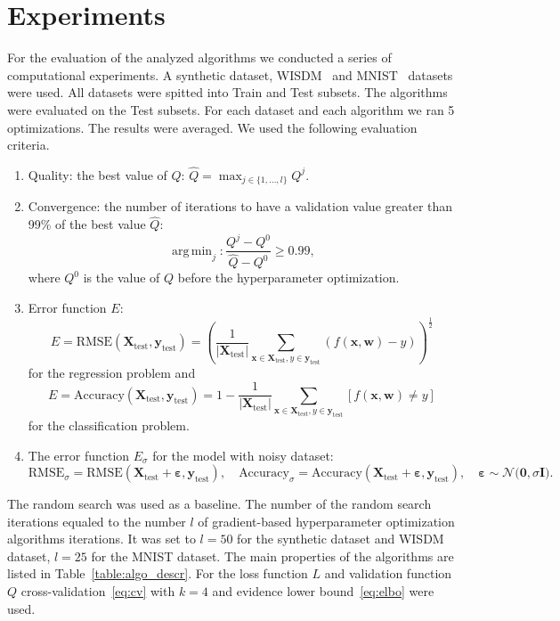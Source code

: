 \documentclass[12pt]{article}
\DeclareMathOperator*{\argmin}{arg\,min}
\begin{document}
\section{Experiments}
For the evaluation of the analyzed algorithms we conducted a series of computational experiments. A synthetic dataset, WISDM~\cite{wisdm} and MNIST~\cite{mnist} datasets were used. All datasets were spitted into Train and Test subsets. The  algorithms were evaluated on the Test subsets. For each dataset and each algorithm we ran 5 optimizations. The results were averaged. 
We used the following evaluation criteria.
\begin{enumerate}
\item Quality: the best value of $Q$:  $\hat{Q} = \max_{j \in \{1, \dots, l\}}Q^j$.
\item Convergence: the number of iterations to have a validation value greater than 99\% of the best value $\hat{Q}$:
\[
    \argmin_{j}: \frac{Q^j - Q^0}{\hat{Q} - Q^0} \geq 0.99,
\]
where $Q^0$ is the value of $Q$ before the hyperparameter optimization. 


\item Error function $E$:\[
    E = \text{RMSE}(\mathbf{X}_\text{test}, \mathbf{y}_\text{test}) = \left (\frac{1}{|\mathbf{X}_\text{test}|}\sum_{\mathbf{x} \in\mathbf{X}_\text{test}, y \in \mathbf{y}_\text{test}}  (f(\mathbf{x}, \mathbf{w})-y)\right)^{\frac{1}{2}}
\]
for the regression problem and
\[
    E = \text{Accuracy}(\mathbf{X}_\text{test}, \mathbf{y}_\text{test}) = 1 - \frac{1}{|\mathbf{X}_\text{test}|}\sum_{\mathbf{x} \in\mathbf{X}_\text{test}, y \in \mathbf{y}_\text{test}} [f(\mathbf{x}, \mathbf{w}) \neq y]
\]
for the classification problem.


\item The error function  $E_\sigma$ for the model with noisy dataset:
\[
    \text{RMSE}_\sigma =  \text{RMSE}(\mathbf{X}_\text{test} +  \boldsymbol{\varepsilon}, \mathbf{y}_\text{test}), \quad \text{Accuracy}_\sigma =  \text{Accuracy}(\mathbf{X}_\text{test} +  \boldsymbol{\varepsilon}, \mathbf{y}_\text{test}),  \quad \boldsymbol{\varepsilon} \sim \mathcal{N}\bigl(\mathbf{0}, \sigma\mathbf{I}\bigr).
\]
\end{enumerate}

The random search was used as a baseline. The number of the random search iterations equaled to the number $l$ of gradient-based hyperparameter optimization algorithms iterations. It was set to $l=50$ for the synthetic dataset and WISDM dataset, $l=25$ for the MNIST dataset. The main properties of the algorithms are listed in Table~\ref{table:algo_descr}. For the loss  function $L$ and validation function $Q$ cross-validation~\eqref{eq:cv} with $k=4$ and evidence lower bound~\eqref{eq:elbo} were used. 
\end{document}
